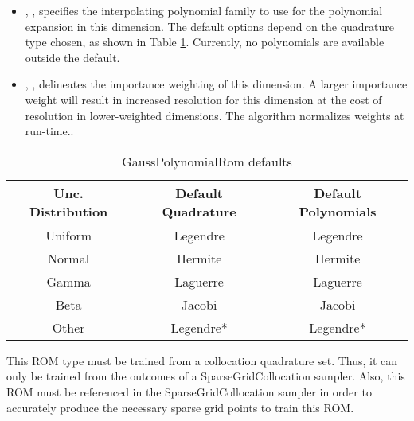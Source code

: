 \begin{itemize}
\begin{itemize}
      depend on the uncertainty distribution of the input dimension, as shown in Table
      \ref{tab:gpcCompatible}. Additionally, Clenshaw Curtis quadrature can be used for any
      distribution that doesn't include an infinite bound.
      \nb For an uncertain distribution aside from the four listed on Table
      \ref{tab:gpcCompatible}, this ROM
      makes use of the uniform-like range of the distribution's CDF to apply quadrature that is
      suited uniform uncertainty (Legendre).  It converges more slowly than the four listed, but are
      viable choices.  Choosing polynomial type Legendre for any non-uniform distribution will
      enable this formulation automatically.
    \item {}, ,
      specifies the interpolating polynomial family to use for the polynomial expansion in this
      dimension.  The default options depend on the quadrature type chosen, as shown in Table
      \ref{tab:gpcCompatible}.  Currently, no polynomials are available outside the
      default. 
    \item  {}, ,
      delineates the importance weighting of this dimension.  A larger importance weight will
      result in increased resolution for this dimension at the cost of resolution in lower-weighted
      dimensions.  The algorithm normalizes weights at run-time..
  \end{itemize}
\end{itemize}
\begin{table}[htb]
  \centering
  \begin{tabular}{c | c c}
    Unc. Distribution & Default Quadrature & Default Polynomials \\ \hline
    Uniform & Legendre & Legendre \\
    Normal & Hermite & Hermite \\ \hline
    Gamma & Laguerre & Laguerre \\
    Beta & Jacobi & Jacobi \\ \hline
    Other & Legendre* & Legendre*
  \end{tabular}
  \caption{GaussPolynomialRom defaults}
  \label{tab:gpcCompatible}
\end{table}
%
\nb This ROM type must be trained from a collocation quadrature set.
%
Thus, it can only be trained from the outcomes of a SparseGridCollocation sampler.
Also, this ROM must be referenced in the SparseGridCollocation sampler in order to
accurately produce the necessary sparse grid points to train this ROM.

